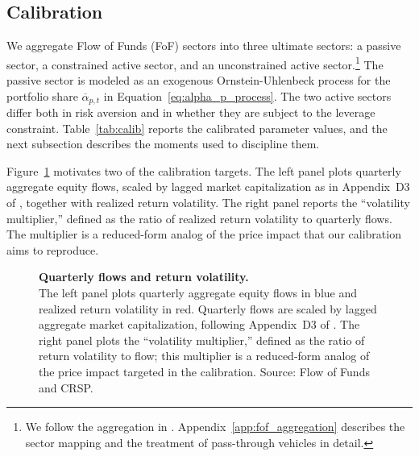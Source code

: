 \documentclass[12pt,english]{article}
\begin{document}
\subsection{Calibration}\label{sec:calibration}

We aggregate Flow of Funds (FoF) sectors into three ultimate sectors: a passive sector, a constrained active sector, and an unconstrained active sector.\footnote{We follow the aggregation in \citet{koijen2024investors}.
Appendix~\ref{app:fof_aggregation} describes the sector mapping and the treatment of pass-through vehicles in detail.}
The passive sector is modeled as an exogenous Ornstein-Uhlenbeck process for the portfolio share $\overline{\alpha}_{p,t}$ in Equation~\eqref{eq:alpha_p_process}.
The two active sectors differ both in risk aversion and in whether they are subject to the leverage constraint.
Table~\ref{tab:calib} reports the calibrated parameter values, and the next subsection describes the moments used to discipline them.

Figure~\ref{fig:facts-vol-flow} motivates two of the calibration targets.
The left panel plots quarterly aggregate equity flows, scaled by lagged market capitalization as in Appendix~D3 of \citet{gabaix2020search}, together with realized return volatility.
The right panel reports the ``volatility multiplier,'' defined as the ratio of realized return volatility to quarterly flows.
The multiplier is a reduced-form analog of the price impact that our calibration aims to reproduce.

\begin{figure}[!t]
    \centering
    \subfloat{\resizebox{0.49\textwidth}{!}{}}
    \subfloat{\resizebox{0.49\textwidth}{!}{}}
    \vspace{2mm}
    \caption{\textbf{Quarterly flows and return volatility.}\\
    The left panel plots quarterly aggregate equity flows in blue and realized return volatility in red.
    Quarterly flows are scaled by lagged aggregate market capitalization, following Appendix~D3 of \citet{gabaix2020search}.
    The right panel plots the ``volatility multiplier,'' defined as the ratio of return volatility to flow; this multiplier is a reduced-form analog of the price impact targeted in the calibration.
    Source: Flow of Funds and CRSP.}\label{fig:facts-vol-flow}
\end{figure}
\end{document}

